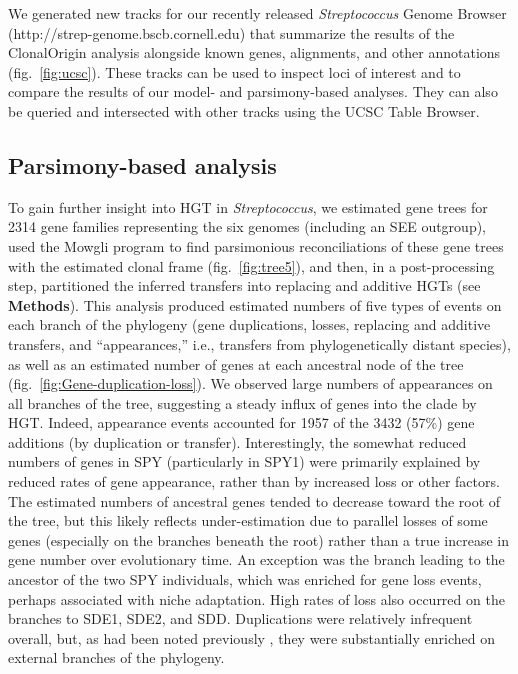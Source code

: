 \documentclass[12pt]{article}
\begin{document}
We generated new tracks for our recently released {\em Streptococcus}
Genome Browser (http://strep-genome.bscb.cornell.edu) that summarize the
results of the ClonalOrigin analysis alongside known genes, alignments, and
other annotations (fig.\ \ref{fig:ucsc}).  These tracks can be used to
inspect loci of interest and to compare the results of our model- and
parsimony-based analyses.  They can also be queried and intersected with
other tracks using the UCSC Table Browser.


\subsection*{Parsimony-based analysis}


To gain further insight into HGT in {\em Streptococcus},
we estimated gene trees for 2314 gene families representing the six 
genomes (including an SEE outgroup), used the Mowgli
program \citep{Doyon2011} to find parsimonious 
reconciliations of these gene trees with the estimated clonal frame
(fig.\ \ref{fig:tree5}), and then, in a post-processing step, partitioned
the inferred transfers into replacing and additive HGTs (see \textbf{Methods}).
This analysis produced estimated numbers of five types of events on each
branch of the phylogeny (gene duplications, losses, replacing and additive
transfers, and ``appearances,'' i.e., transfers from phylogenetically
distant species), as well as an estimated number of genes at each ancestral
node of the tree (fig.\ \ref{fig:Gene-duplication-loss}).
We observed large numbers of appearances on all branches of the tree,
suggesting a steady influx of genes into the clade by HGT.  Indeed,
appearance events accounted for 1957 of the 3432 (57\%) gene additions (by
duplication or transfer).  Interestingly, the somewhat reduced numbers of
genes in SPY (particularly in SPY1) were primarily explained by reduced rates
of gene appearance, rather than by increased loss or other factors.  The
estimated numbers of ancestral genes tended to decrease toward the root of
the tree, but this likely reflects under-estimation due to parallel losses
of some genes (especially on the branches beneath the root) rather than a
true increase in gene number over evolutionary time.  An exception was the
branch leading to the ancestor of the two SPY individuals, which was
enriched for gene loss events, perhaps associated with niche adaptation.
High rates of loss also occurred on the branches to SDE1, SDE2, and SDD.
Duplications were relatively infrequent overall, but, as had been noted
previously \citep{Marri2006}, they were substantially enriched on external
branches of the phylogeny.
\end{document}
